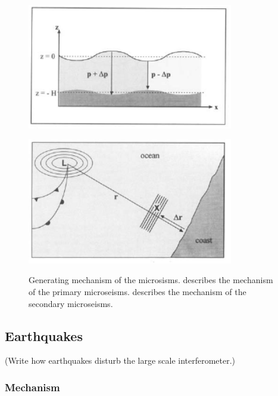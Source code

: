 \begin{figure}[h]
  \begin{center}
    \begin{minipage}[b]{0.65\hsize}
      \centering
      \includegraphics[width=9.0cm]{./img_chap3/img311.png}
      \label{img:img311}
    \end{minipage}
    \begin{minipage}[b]{0.65\hsize}
      \centering      
      \includegraphics[width=9.0cm]{./img_chap3/img312.png}
      \label{img:img312}
    \end{minipage}
  \end{center}
  \caption{ Generating mechanism of the microsisms.  describes the mechanism of the primary microseisms.  describes the mechanism of the secondary microseisms.}
\end{figure}


\subsection{Earthquakes}
(Write how earthquakes disturb the large scale interferometer.)

\subsubsection{Mechanism}



